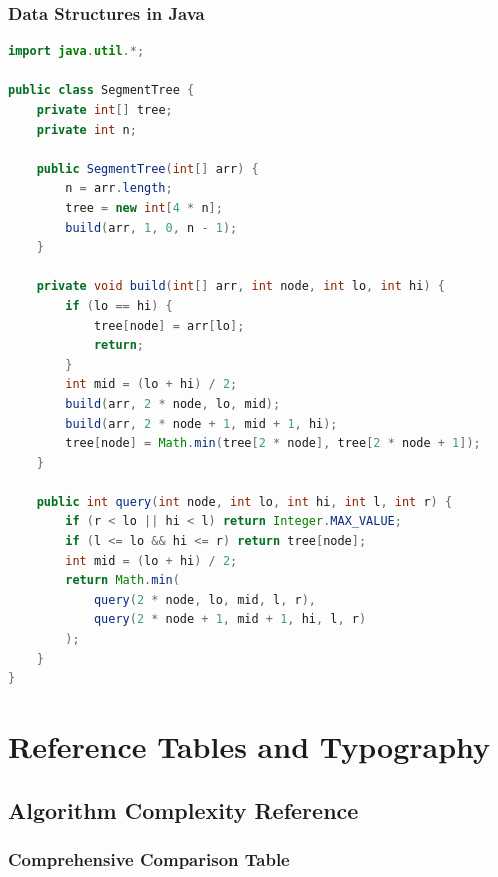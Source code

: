 \subsubsection{Data Structures in Java}

\begin{lstlisting}[language=Java]
import java.util.*;

public class SegmentTree {
    private int[] tree;
    private int n;

    public SegmentTree(int[] arr) {
        n = arr.length;
        tree = new int[4 * n];
        build(arr, 1, 0, n - 1);
    }

    private void build(int[] arr, int node, int lo, int hi) {
        if (lo == hi) {
            tree[node] = arr[lo];
            return;
        }
        int mid = (lo + hi) / 2;
        build(arr, 2 * node, lo, mid);
        build(arr, 2 * node + 1, mid + 1, hi);
        tree[node] = Math.min(tree[2 * node], tree[2 * node + 1]);
    }

    public int query(int node, int lo, int hi, int l, int r) {
        if (r < lo || hi < l) return Integer.MAX_VALUE;
        if (l <= lo && hi <= r) return tree[node];
        int mid = (lo + hi) / 2;
        return Math.min(
            query(2 * node, lo, mid, l, r),
            query(2 * node + 1, mid + 1, hi, l, r)
        );
    }
}
\end{lstlisting}


\section{Reference Tables and Typography}

\subsection{Algorithm Complexity Reference}

\subsubsection{Comprehensive Comparison Table}


